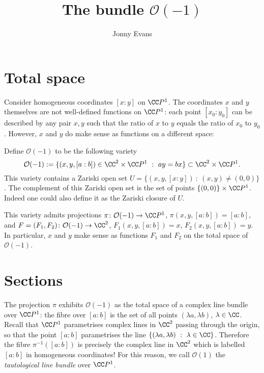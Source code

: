 \documentclass{amsart}
\title{The bundle $\mathcal{O}(-1)$}
\author{Jonny Evans}
\begin{document}
\section{Total space}

Consider homogeneous coordinates $[x:y]$ on $\CC P^1$. The coordinates $x$ and $y$ themselves are not well-defined functions on $\CC P^1$: each point $[x_0:y_0]$ can be described by any pair $x,y$ such that the ratio of $x$ to $y$ equals the ratio of $x_0$ to $y_0$. However, $x$ and $y$ do make sense as functions on a different space:

\begin{Definition}[dfntautbun]
Define $\mathcal{O}(-1)$ to be the following variety
\[\mathcal{O}(-1):=\{(x,y,[a:b])\in\CC^2\times\CC P^1\ :\ ay=bx\}\subset\CC^2\times\CC P^1.\]
This variety contains a Zariski open set $U=\{(x,y,[x:y])\ :\ (x,y)\neq (0,0)\}$. The complement of this Zariski open set is the set of points $\{(0,0)\}\times\CC P^1$. Indeed one could also define it as the Zariski closure of $U$.
\end{Definition}
This variety admits projections $\pi\colon\mathcal{O}(-1)\to\CC P^1$, $\pi(x,y,[a:b])=[a:b]$, and $F=(F_1,F_2)\colon\mathcal{O}(-1)\to\CC^2$, $F_1(x,y,[a:b])=x$, $F_2(x,y,[a:b])=y$. In particular, $x$ and $y$ make sense as functions $F_1$ and $F_2$ on the total space of $\mathcal{O}(-1)$.

\section{Sections}

The projection $\pi$ exhibits $\mathcal{O}(-1)$ as the total space of a complex line bundle over $\CC P^1$: the fibre over $[a:b]$ is the set of all points $(\lambda a,\lambda b)$, $\lambda\in\CC$. Recall that $\CC P^1$ parametrises complex lines in $\CC^2$ passing through the origin, so that the point $[a:b]$ parametrises the line $\{(\lambda a,\lambda b)\ :\ \lambda\in\CC\}$. Therefore the fibre $\pi^{-1}([a:b])$ is precisely the complex line in $\CC^2$ which is labelled $[a:b]$ in homogeneous coordinates! For this reason, we call $\mathcal{O}(1)$ the {\em tautological line bundle} over $\CC P^1$.
\end{document}
